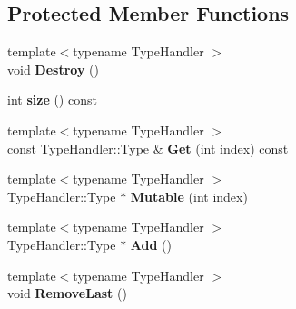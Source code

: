 \subsection*{Protected Member Functions}
\begin{DoxyCompactItemize}
\item 
\mbox{\label{classgoogle_1_1protobuf_1_1internal_1_1RepeatedPtrFieldBase_a0657788a258fc5ecc59814583f3409cb}} 
{\footnotesize template$<$typename Type\+Handler $>$ }\\void {\bfseries Destroy} ()
\item 
\mbox{\label{classgoogle_1_1protobuf_1_1internal_1_1RepeatedPtrFieldBase_ae9024e422100e8fed315e0414a88d060}} 
int {\bfseries size} () const
\item 
\mbox{\label{classgoogle_1_1protobuf_1_1internal_1_1RepeatedPtrFieldBase_a680144ed639619f90fc017f3fe81287d}} 
{\footnotesize template$<$typename Type\+Handler $>$ }\\const Type\+Handler\+::\+Type \& {\bfseries Get} (int index) const
\item 
\mbox{\label{classgoogle_1_1protobuf_1_1internal_1_1RepeatedPtrFieldBase_af7a80eebe709ea03140bd57740edd671}} 
{\footnotesize template$<$typename Type\+Handler $>$ }\\Type\+Handler\+::\+Type $\ast$ {\bfseries Mutable} (int index)
\item 
\mbox{\label{classgoogle_1_1protobuf_1_1internal_1_1RepeatedPtrFieldBase_a5b2f887e4d7d66b43659f6da38753360}} 
{\footnotesize template$<$typename Type\+Handler $>$ }\\Type\+Handler\+::\+Type $\ast$ {\bfseries Add} ()
\item 
\mbox{\label{classgoogle_1_1protobuf_1_1internal_1_1RepeatedPtrFieldBase_aabdf22f7d2a055f5006151d2dd8730ef}} 
{\footnotesize template$<$typename Type\+Handler $>$ }\\void {\bfseries Remove\+Last} ()

\end{DoxyCompactItemize}
